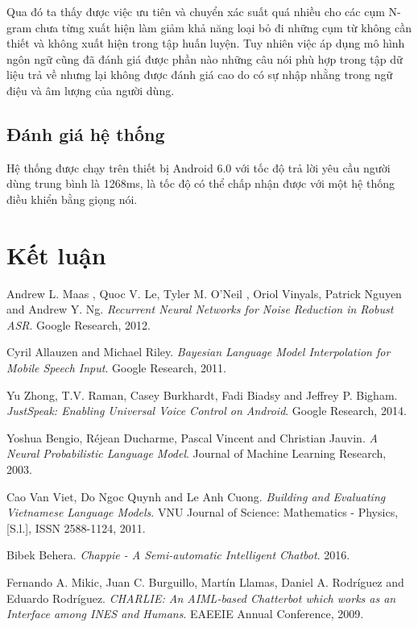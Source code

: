 \documentclass[12pt]{report}
\begin{document}
Qua đó ta thấy được việc ưu tiên và chuyển xác suất quá nhiều cho các cụm N-gram chưa từng xuất hiện làm giảm khả năng loại bỏ đi những cụm từ không cần thiết và không xuất hiện trong tập huấn luyện. Tuy nhiên việc áp dụng mô hình ngôn ngữ cũng đã đánh giá được phần nào những câu nói phù hợp trong tập dữ liệu trả về nhưng lại không được đánh giá cao do có sự nhập nhằng trong ngữ điệu và âm lượng của người dùng. 

\section{Đánh giá hệ thống}

Hệ thống được chạy trên thiết bị Android 6.0 với tốc độ trả lời yêu cầu người dùng trung bình là 1268ms, là tốc độ có thể chấp nhận được với một hệ thống điều khiển bằng giọng nói.

\stopcontents[parts]

\chapter*{Kết luận}

\begin{thebibliography}{9}
Andrew L. Maas , Quoc V. Le, Tyler M. O’Neil , Oriol Vinyals, Patrick Nguyen and Andrew Y. Ng. 
\textit{Recurrent Neural Networks for Noise Reduction in Robust ASR}. 
Google Research, 2012.

Cyril Allauzen and Michael Riley. 
\textit{Bayesian Language Model Interpolation for Mobile Speech Input}. 
Google Research, 2011.

Yu Zhong, T.V. Raman, Casey Burkhardt, Fadi Biadsy and Jeffrey P. Bigham. 
\textit{JustSpeak: Enabling Universal Voice Control on Android}. 
Google Research, 2014.

Yoshua Bengio, Réjean Ducharme, Pascal Vincent and Christian Jauvin. 
\textit{A Neural Probabilistic Language Model}. 
Journal of Machine Learning Research, 2003.

Cao Van Viet, Do Ngoc Quynh and Le Anh Cuong. 
\textit{Building and Evaluating Vietnamese Language Models}. 
VNU Journal of Science: Mathematics - Physics, [S.l.], ISSN 2588-1124, 2011.

Bibek Behera. 
\textit{Chappie - A Semi-automatic Intelligent Chatbot}. 
2016.

Fernando A. Mikic, Juan C. Burguillo, Martín Llamas, Daniel A. Rodríguez and Eduardo Rodríguez. 
\textit{CHARLIE: An AIML-based Chatterbot which works as an Interface among INES and Humans}. 
EAEEIE Annual Conference, 2009.

\end{thebibliography}

\end{document}
